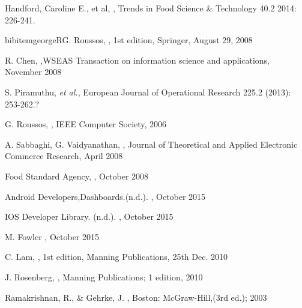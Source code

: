 \documentclass[a4paper, 11pt]{article}
\begin{document}
\begin{thebibliography}{29}
Handford, Caroline E., et al, \emph{}, Trends in Food Science \& Technology 40.2 2014: 226-241.
\vspace{\baselineskip}

bibitem{georgeR}G. Roussos, \emph{}, 1st edition, Springer, August 29, 2008
\vspace{\baselineskip}

 R. Chen, \emph{},WSEAS Transaction on information science and applications, November 2008
\vspace{\baselineskip}

S. Piramuthu, \emph{et al.}, \emph{} European Journal of Operational Research 225.2 (2013): 253-262.?\vspace{\baselineskip}

G. Roussos, \emph{}, IEEE Computer Society, 2006
\vspace{\baselineskip}

A. Sabbaghi, G. Vaidyanathan, \emph{}, Journal of Theoretical and Applied Electronic Commerce Research, April 2008

Food Standard Agency, \emph{}, October 2008
\vspace{\baselineskip}

Android Developers,Dashboards.(n.d.). \emph{}, October 2015
\vspace{\baselineskip}

IOS Developer Library. (n.d.). \emph{}, October 2015
\vspace{\baselineskip}

M. Fowler \emph{}, October 2015
\vspace{\baselineskip}

C. Lam, \emph{}, 1st edition, Manning Publications, 25th Dec. 2010
\vspace{\baselineskip}

J. Rosenberg, \emph{}, Manning Publications; 1 edition, 2010
\vspace{\baselineskip}

Ramakrishnan, R., \& Gehrke, J. \emph{}, Boston: McGraw-Hill,(3rd ed.); 2003
\vspace{\baselineskip}

\end{thebibliography}
\end{document}
